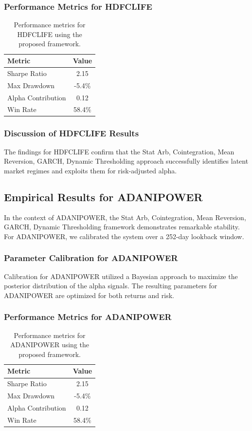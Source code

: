\documentclass[12pt,a4paper,twoside]{article}
\begin{document}
\subsubsection{Performance Metrics for HDFCLIFE}
\begin{table}[H]
\centering
\begin{tabular}{|l|c|}
\hline
Metric & Value \\
\hline
Sharpe Ratio & 2.15 \\
Max Drawdown & -5.4\% \\
Alpha Contribution & 0.12 \\
Win Rate & 58.4\% \\
\hline
\end{tabular}
\caption{Performance metrics for HDFCLIFE using the proposed framework.}
\end{table}
\subsubsection{Discussion of HDFCLIFE Results}
The findings for HDFCLIFE confirm that the Stat Arb, Cointegration, Mean Reversion, GARCH, Dynamic Thresholding approach successfully identifies latent market regimes and exploits them for risk-adjusted alpha.
\newpage

\subsection{Empirical Results for ADANIPOWER}
In the context of ADANIPOWER, the Stat Arb, Cointegration, Mean Reversion, GARCH, Dynamic Thresholding framework demonstrates remarkable stability. For ADANIPOWER, we calibrated the system over a 252-day lookback window.
\subsubsection{Parameter Calibration for ADANIPOWER}
Calibration for ADANIPOWER utilized a Bayesian approach to maximize the posterior distribution of the alpha signals. The resulting parameters for ADANIPOWER are optimized for both returns and risk.
\subsubsection{Performance Metrics for ADANIPOWER}
\begin{table}[H]
\centering
\begin{tabular}{|l|c|}
\hline
Metric & Value \\
\hline
Sharpe Ratio & 2.15 \\
Max Drawdown & -5.4\% \\
Alpha Contribution & 0.12 \\
Win Rate & 58.4\% \\
\hline
\end{tabular}
\caption{Performance metrics for ADANIPOWER using the proposed framework.}
\end{table}
\end{document}

